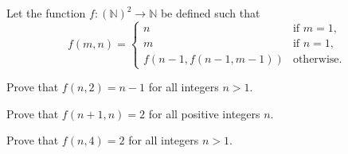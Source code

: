 \begin{problem}
    Let the function $f: \left(\mathbb{N}\right)^2\to\mathbb{N}$ be defined such that
    \[
        f(m, n) =
        \begin{cases}
            n & \text{if } m = 1, \\
            m & \text{if } n = 1, \\
            f\left(n-1,f(n-1,m-1)\right) & \text{otherwise.}
        \end{cases}
    \]
    \begin{partquestions}{\roman*}
        \item Prove that $f(n,2) = n - 1$ for all integers $n > 1$.
        \item Prove that $f(n+1, n) = 2$ for all positive integers $n$.
        \item Prove that $f(n, 4) = 2$ for all integers $n > 1$.
    \end{partquestions}
\end{problem}
